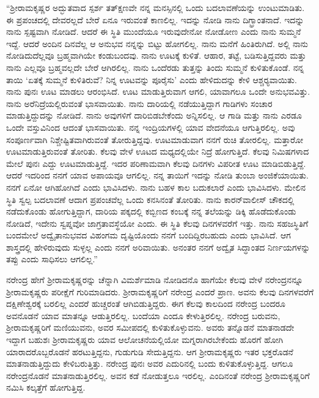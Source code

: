 “ಶ‍್ರೀರಾಮಕೃಷ್ಣರ ಅದ್ಭುತವಾದ ಸ್ಪರ್ಶ ‍ತತ್‍ಕ್ಷಣವೇ ನನ್ನ ಮನಸ್ಸಿನಲ್ಲಿ ಒಂದು ಬದಲಾವಣೆಯನ್ನು ಉಂಟುಮಾಡಿತು. ಈ ಪ್ರಪಂಚದಲ್ಲಿ ದೇವರಲ್ಲದೆ ಬೇರೆ ಏನೂ ಇರುವಂತೆ ಕಾಣಲಿಲ್ಲ. ಇದನ್ನು ನೋಡಿ ನಾನು ದಿಗ್ಭ್ರಾಂತನಾದೆ. ಇದನ್ನು ನಾನು ಸ್ಪಷ್ಟವಾಗಿ ನೋಡಿದೆ. ಆದರೆ ಈ ಸ್ಥಿತಿ ಮುಂದೆಯೂ ಇರುವುದೇನೋ ನೋಡೋಣ ಎಂದು ನಾನು ಸುಮ್ಮನೆ ಇದ್ದೆ. ಆದರೆ ಅಂದಿನ ದಿನವೆಲ್ಲ ಆ ಅನುಭವ ನನ್ನನ್ನು ಬಿಟ್ಟು ಹೋಗಲಿಲ್ಲ. ನಾನು ಮನೆಗೆ ಹಿಂತಿರುಗಿದೆ. ಅಲ್ಲಿ ನಾನು ನೋಡಿದುದೆಲ್ಲವೂ ಬ್ರಹ್ಮವಾಗಿಯೇ ಕಂಡುಬಂದವು. ನಾನು ಊಟಕ್ಕೆ ಕುಳಿತೆ. ಆಹಾರ, ತಟ್ಟೆ, ಬಡಿಸುತ್ತಿದ್ದವರು ಮತ್ತು ನಾನು ಎಲ್ಲವೂ ಬ್ರಹ್ಮವಲ್ಲದೇ ಬೇರೆ ಆಗಿರಲಿಲ್ಲ. ನಾನು ಒಂದೆರಡು ತುತ್ತನ್ನು ತಿಂದು ಸುಮ್ಮನೆ ಕುಳಿತುಕೊಂಡೆ. ನನ್ನ ತಾಯಿ ‘ಏತಕ್ಕೆ ಸುಮ್ಮನೆ ಕುಳಿತಿರುವೆ? ನಿನ್ನ ಊಟವನ್ನು ಪೂರೈಸು’ ಎಂದು ಹೇಳಿದುದನ್ನು ಕೇಳಿ ಆಶ್ಚರ‍್ಯವಾಯಿತು. ನಾನು ಪುನಃ ಊಟ ಮಾಡಲು ಆರಂಭಿಸಿದೆ. ಊಟ ಮಾಡುತ್ತಿರುವಾಗ ಆಗಲಿ, ಯಾವಾಗಲೂ ಒಂದೇ ಅನುಭವವಿತ್ತು. ನಾನು ಅರೆನಿದ್ರೆಯಲ್ಲಿರುವಂತೆ ಭಾಸವಾಯಿತು. ನಾನು ದಾರಿಯಲ್ಲಿ ನಡೆಯುತ್ತಿದ್ದಾಗ ಗಾಡಿಗಳು ಸಂಚಾರ ಮಾಡುತ್ತಿದ್ದುದನ್ನು ನೋಡಿದೆ. ನಾನು ಅವುಗಳಿಗೆ ದಾರಿಬಿಡಬೇಕೆಂದು ಅನ್ನಿಸಲಿಲ್ಲ. ಆ ಗಾಡಿ ಮತ್ತು ನಾನು ಎರಡೂ ಒಂದೇ ವಸ್ತುವಿನಿಂದ ಆದಂತೆ ಭಾಸವಾಯಿತು. ನನ್ನ ಇಂದ್ರಿಯಗಳಲ್ಲಿ ಯಾವ ವೇದನೆಯೂ ಆಗುತ್ತಿರಲಿಲ್ಲ. ಅವು ಸಂಪೂರ್ಣವಾಗಿ ನಿಶ್ಚೇಷ್ಟಿತವಾಗಿರುವಂತೆ ತೋರುತ್ತಿದ್ದವು. ಊಟಮಾಡುವಾಗ ನನಗೆ ರುಚಿ ತೋರಲಿಲ್ಲ. ಮತ್ತಾರೋ ಊಟಮಾಡುತ್ತಿರುವಂತೆ ತೋರಿತು. ಕೆಲವು ವೇಳೆ ಊಟದ ಮಧ್ಯದಲ್ಲಿಯೇ ನಿದ್ರೆ ಹೋಗುತ್ತಿದೆ. ಕೆಲವು ನಿಮಿಷಗಳಾದ ಮೇಲೆ ಪುನಃ ಎದ್ದು ಊಟಮಾಡುತ್ತಿದ್ದೆ. ಇದರ ಪರಿಣಾಮವಾಗಿ ಕೆಲವು ದಿನಗಳು ವಿಪರೀತ ಊಟ ಮಾಡಿಬಿಡುತ್ತಿದ್ದೆ. ಆದರೆ ಇದರಿಂದ ನನಗೆ ಯಾವ ಅಪಾಯವೂ ಆಗಲಿಲ್ಲ. ನನ್ನ ತಾಯಿಗೆ ಇದನ್ನು ನೋಡಿ ತುಂಬಾ ಅಂಜಿಕೆಯಾಯಿತು. ನನಗೆ ಏನೋ ಆಗಿಹೋಗಿದೆ ಎಂದು ಭಾವಿಸಿದಳು. ನಾನು ಬಹಳ ಕಾಲ ಬದುಕಲಾರೆ ಎಂದು ಭಾವಿಸಿದಳು. ಮೇಲಿನ ಸ್ಥಿತಿ ಸ್ವಲ್ಪ ಬದಲಾವಣೆ ಆದಾಗ ಪ್ರಪಂಚವೆಲ್ಲ ಒಂದು ಕನಸಿನಂತೆ ತೋರಿತು. ನಾನು ಕಾರನ್‍ವಾಲೀಸ್ ಚೌಕದಲ್ಲಿ ನಡೆದುಕೊಂಡು ಹೋಗುತ್ತಿದ್ದಾಗ, ದಾರಿಯ ಪಕ್ಕದಲ್ಲಿ ಕಬ್ಬಿಣದ ಕಂಬಕ್ಕೆ ನನ್ನ ತಲೆಯನ್ನು ಡಿಕ್ಕಿ ಹೊಡೆದುಕೊಂಡು ನೋಡಿದೆ, ಇದೇನು ಸ್ವಪ್ನವೋ ಜಾಗ್ರತಾವಸ್ಥೆಯೋ ಎಂದು. ಈ ಸ್ಥಿತಿ ಕೆಲವು ದಿನಗಳವರೆಗೆ ಇತ್ತು. ನಾನು ಸಹಜಸ್ಥಿತಿಗೆ ಬಂದಮೇಲೆ ಅದ್ವೈತಾನುಭವದ ವಿಹಂಗಮ ದೃಷ್ಟಿಯೊಂದು ನನಗೆ ಬಂದಿದ್ದಿರಬಹುದು ಎಂದು ಭಾವಿಸಿದೆ. ಆಗ ಶಾಸ್ತ್ರದಲ್ಲಿ ಹೇಳಿರುವುದು ಸುಳ್ಳಲ್ಲ ಎಂದು ನನಗೆ ಅರಿವಾಯಿತು. ಅನಂತರ ನನಗೆ ಅದ್ವೈತ ಸಿದ್ಧಾಂತದ ನಿರ್ಣಯಗಳನ್ನು ತಪ್ಪು ಎಂದು ಸಾಧಿಸಲು ಆಗಲಿಲ್ಲ.”

\vskip 3pt

ನರೇಂದ್ರ ಹೇಗೆ ಶ‍್ರೀರಾಮಕೃಷ್ಣರನ್ನು ಚೆನ್ನಾಗಿ ವಿಮರ್ಶೆಮಾಡಿ ನೋಡಿದನೊ ಹಾಗೆಯೇ ಕೆಲವು ವೇಳೆ ನರೇಂದ್ರನನ್ನೂ ಶ‍್ರೀರಾಮಕೃಷ್ಣರು ಪರೀಕ್ಷೆಗೆ ಗುರಿಮಾಡಿದರು. ಶ‍್ರೀರಾಮಕೃಷ್ಣರಿಗೆ ನರೇಂದ್ರ ಎಂದರೆ ಪ್ರಾಣ. ಅವನು ಕೆಲವು ದಿನಗಳವರೆಗೆ ದಕ್ಷಿಣೇಶ್ವರಕ್ಕೆ ಬರಲಿಲ್ಲ ಎಂದರೆ ಹುಚ್ಚರಂತೆ ಆಗಿಬಿಡುತ್ತಿದ್ದರು. ಈಗ ಕೆಲವು ಕಾಲದಿಂದ ನರೇಂದ್ರ ಬಂದರೂ ಅವನೊಡನೆ ಯಾವ ಮಾತನ್ನೂ ಆಡುತ್ತಿರಲಿಲ್ಲ. ಬಂದೆಯಾ ಎಂದೂ ಕೇಳುತ್ತಿರಲಿಲ್ಲ. ನರೇಂದ್ರ ಬರುವನು, ಶ‍್ರೀರಾಮಕೃಷ್ಣರಿಗೆ ಮಣಿಯುವನು, ಅವರ ಸಮೀಪದಲ್ಲಿ ಕುಳಿತುಕೊಳ್ಳುವನು. ಅವರು ತನ್ನೊಡನೆ ಮಾತನಾಡದೇ ಇದ್ದಾಗ ಬಹುಶಃ ಶ‍್ರೀರಾಮಕೃಷ್ಣರು ಯಾವ ಆಲೋಚನೆಯಲ್ಲಿಯೋ ಮಗ್ನರಾಗಿರಬೇಕೆಂದು ಹೊರಗೆ ಹೋಗಿ ಯಾರಾದರೊಬ್ಬರೊಡನೆ ಹರಟುತ್ತಿದ್ದನು, ಗುಡುಗುಡಿ ಸೇದುತ್ತಿದ್ದನು. ಆಗ ಶ‍್ರೀರಾಮಕೃಷ್ಣರು ಇತರ ಭಕ್ತರೊಡನೆ ಮಾತನಾಡುತ್ತಿದ್ದುದು ಕೇಳಿಬರುತ್ತಿತ್ತು. ನರೇಂದ್ರ ಪುನಃ ಅವರ ಎದುರಿನಲ್ಲಿ ಬಂದು ಕುಳಿತುಕೊಳ್ಳುತ್ತಿದ್ದ. ಆಗಲೂ ನರೇಂದ್ರನೊಡನೆ ಮಾತನಾಡುತ್ತಿರಲಿಲ್ಲ. ಅವನ ಕಡೆ ನೋಡುತ್ತಲೂ ಇರಲಿಲ್ಲ. ಎಂದಿನಂತೆ ನರೇಂದ್ರ ಶ‍್ರೀರಾಮಕೃಷ್ಣರಿಗೆ ನಮಿಸಿ ಕಲ್ಕತ್ತೆಗೆ ಹೋಗುತ್ತಿದ್ದ.

